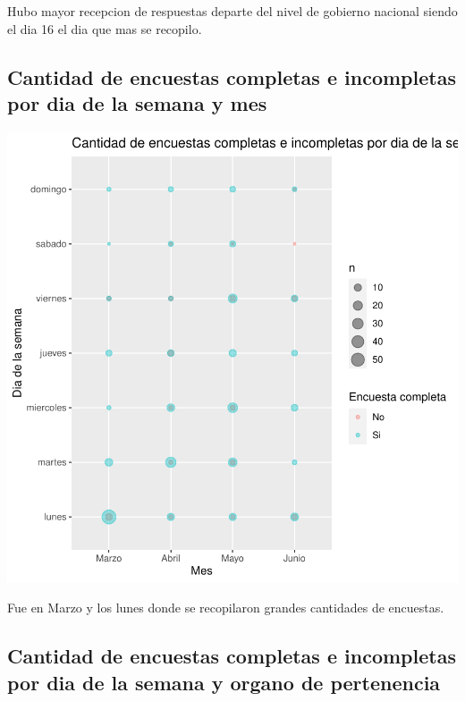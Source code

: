 \documentclass{article}
\begin{document}
Hubo mayor recepcion de respuestas departe del nivel de gobierno nacional siendo el dia 16 el dia que mas se recopilo.

\subsection{Cantidad de encuestas completas e incompletas por dia de la semana y mes}

\includegraphics{seguimientov3-082}

Fue en Marzo y los lunes donde se recopilaron grandes cantidades de encuestas.

\subsection{Cantidad de encuestas completas e incompletas por dia de la semana y organo de pertenencia}
\end{document}
